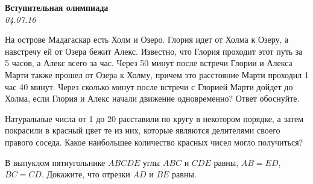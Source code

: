 \begin{center}
\textbf{\Large Вступительная олимпиада}\\
\textit{04.07.16}
\end{center}


\begin{problems}

\item На острове Мадагаскар есть Холм и Озеро. Глория идет от Холма к Озеру, а навстречу ей от Озера бежит Алекс. Известно, что Глория проходит этот путь за 5 часов, а Алекс всего за час. Через 50 минут после встречи Глории и Алекса Марти также прошел от Озера к Холму, причем это расстояние Марти проходил 1 час 40 минут. Через сколько минут после встречи с Глорией Марти дойдет до Холма, если Глория и Алекс начали движение одновременно? Ответ обоснуйте.




\item Натуральные числа от 1 до 20 расставили по кругу в некотором порядке, а затем покрасили в красный цвет те из них, которые являются делителями своего правого соседа. Какое наибольшее количество красных чисел могло получиться?

\item В выпуклом пятиугольнике $ABCDE$ углы $ABC$ и $CDE$ равны, $AB=ED$, $BC=CD$. Докажите, что отрезки $AD$ и $BE$ равны.


\end{problems}
